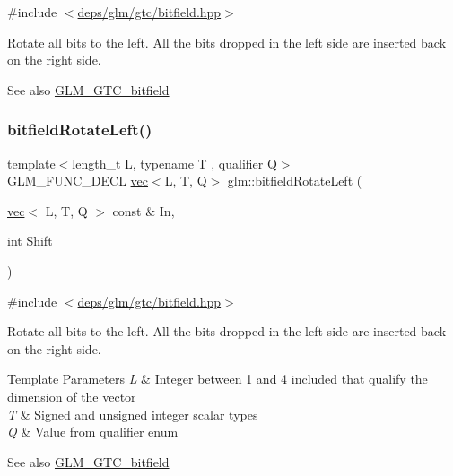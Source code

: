 {\ttfamily \#include $<$\hyperlink{bitfield_8hpp}{deps/glm/gtc/bitfield.\+hpp}$>$}

Rotate all bits to the left. All the bits dropped in the left side are inserted back on the right side.

\begin{DoxySeeAlso}{See also}
\hyperlink{group__gtc__bitfield}{G\+L\+M\+\_\+\+G\+T\+C\+\_\+bitfield} 
\end{DoxySeeAlso}
\mbox{\label{group__gtc__bitfield_gae186317091b1a39214ebf79008d44a1e}} 
\subsubsection{\texorpdfstring{bitfield\+Rotate\+Left()}{bitfieldRotateLeft()}\hspace{0.1cm}{\footnotesize\ttfamily [2/2]}}
{\footnotesize\ttfamily template$<$length\+\_\+t L, typename T , qualifier Q$>$ \\
G\+L\+M\+\_\+\+F\+U\+N\+C\+\_\+\+D\+E\+CL \hyperlink{structglm_1_1vec}{vec}$<$L, T, Q$>$ glm\+::bitfield\+Rotate\+Left (\begin{DoxyParamCaption}\item[{\hyperlink{structglm_1_1vec}{vec}$<$ L, T, Q $>$ const \&}]{In,  }\item[{int}]{Shift }\end{DoxyParamCaption})}



{\ttfamily \#include $<$\hyperlink{bitfield_8hpp}{deps/glm/gtc/bitfield.\+hpp}$>$}

Rotate all bits to the left. All the bits dropped in the left side are inserted back on the right side.


\begin{DoxyTemplParams}{Template Parameters}
{\em L} & Integer between 1 and 4 included that qualify the dimension of the vector \\
\hline
{\em T} & Signed and unsigned integer scalar types \\
\hline
{\em Q} & Value from qualifier enum\\
\hline
\end{DoxyTemplParams}
\begin{DoxySeeAlso}{See also}
\hyperlink{group__gtc__bitfield}{G\+L\+M\+\_\+\+G\+T\+C\+\_\+bitfield} 
\end{DoxySeeAlso}


